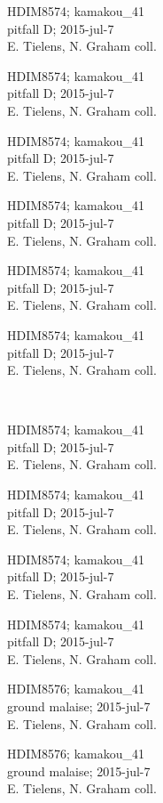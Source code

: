 \documentclass[2pt]{extarticle}
\begin{document}
\noindent
\raggedright
\parbox{0.16\textwidth}{\tiny \raggedright \rule[-0.3\baselineskip]{0pt}{10pt}HDIM8574; kamakou\_41\\ pitfall D; 2015-jul-7\\ E. Tielens, N. Graham coll.}
\parbox{0.16\textwidth}{\tiny \raggedright \rule[-0.3\baselineskip]{0pt}{10pt}HDIM8574; kamakou\_41\\ pitfall D; 2015-jul-7\\ E. Tielens, N. Graham coll.}
\parbox{0.16\textwidth}{\tiny \raggedright \rule[-0.3\baselineskip]{0pt}{10pt}HDIM8574; kamakou\_41\\ pitfall D; 2015-jul-7\\ E. Tielens, N. Graham coll.}
\parbox{0.16\textwidth}{\tiny \raggedright \rule[-0.3\baselineskip]{0pt}{10pt}HDIM8574; kamakou\_41\\ pitfall D; 2015-jul-7\\ E. Tielens, N. Graham coll.}
\parbox{0.16\textwidth}{\tiny \raggedright \rule[-0.3\baselineskip]{0pt}{10pt}HDIM8574; kamakou\_41\\ pitfall D; 2015-jul-7\\ E. Tielens, N. Graham coll.}
\parbox{0.16\textwidth}{\tiny \raggedright \rule[-0.3\baselineskip]{0pt}{10pt}HDIM8574; kamakou\_41\\ pitfall D; 2015-jul-7\\ E. Tielens, N. Graham coll.} \\ 
\vspace{0.001in} 

\noindent
\parbox{0.16\textwidth}{\tiny \raggedright \rule[-0.3\baselineskip]{0pt}{10pt}HDIM8574; kamakou\_41\\ pitfall D; 2015-jul-7\\ E. Tielens, N. Graham coll.}
\parbox{0.16\textwidth}{\tiny \raggedright \rule[-0.3\baselineskip]{0pt}{10pt}HDIM8574; kamakou\_41\\ pitfall D; 2015-jul-7\\ E. Tielens, N. Graham coll.}
\parbox{0.16\textwidth}{\tiny \raggedright \rule[-0.3\baselineskip]{0pt}{10pt}HDIM8574; kamakou\_41\\ pitfall D; 2015-jul-7\\ E. Tielens, N. Graham coll.}
\parbox{0.16\textwidth}{\tiny \raggedright \rule[-0.3\baselineskip]{0pt}{10pt}HDIM8574; kamakou\_41\\ pitfall D; 2015-jul-7\\ E. Tielens, N. Graham coll.}
\parbox{0.16\textwidth}{\tiny \raggedright \rule[-0.3\baselineskip]{0pt}{10pt}HDIM8576; kamakou\_41\\ ground malaise; 2015-jul-7\\ E. Tielens, N. Graham coll.}
\parbox{0.16\textwidth}{\tiny \raggedright \rule[-0.3\baselineskip]{0pt}{10pt}HDIM8576; kamakou\_41\\ ground malaise; 2015-jul-7\\ E. Tielens, N. Graham coll.} \\ 
\vspace{0.001in} 
\end{document}
